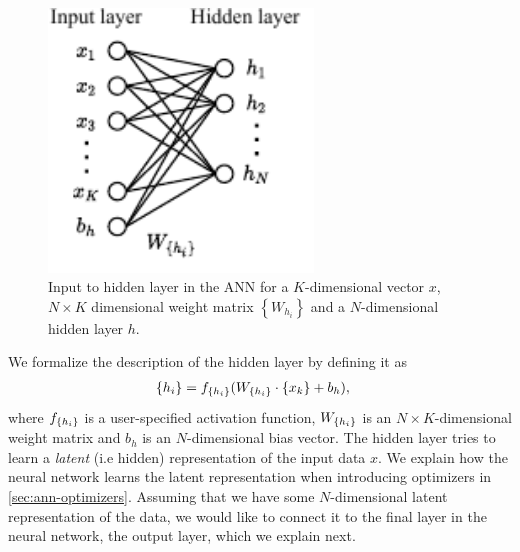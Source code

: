 \begin{figure}[H]
    \centering
    \includegraphics[height=7cm]{thesis/figures/artificial-neural-network-input-hidden-layer_cropped.pdf}
    \caption{Input to hidden layer in the ANN for a $K$-dimensional vector $x$, $N\times K$ dimensional weight matrix $\left\{ W_{h_i} \right\}$ and a $N$-dimensional hidden layer $h$.}
    \label{fig:hidden_layer_ann}
\end{figure}
We formalize the description of the hidden layer by defining it as
\begin{align}
    \label{eqn:hidden-layer-ann}
    \left\{ {h}_{i} \right\} &= f_{\left\{ {h}_{i} \right\}}(W_{\left\{ {h}_{i} \right\}} \cdot \left\{ {x}_{k} \right\} + b_h),
\end{align}
where $f_{\left\{ {h}_{i} \right\}}$ is a user-specified activation function, $W_{\left\{ {h}_{i} \right\}}$ is an $N \times K$-dimensional weight matrix and $b_h$ is an $N$-dimensional bias vector. The hidden layer tries to learn a \textit{latent} (i.e hidden) representation of the input data $x$. We explain how the neural network learns the latent representation when introducing optimizers in \cref{sec:ann-optimizers}. Assuming that we have some $N$-dimensional latent representation of the data, we would like to connect it to the final layer in the neural network, the output layer, which we explain next.

